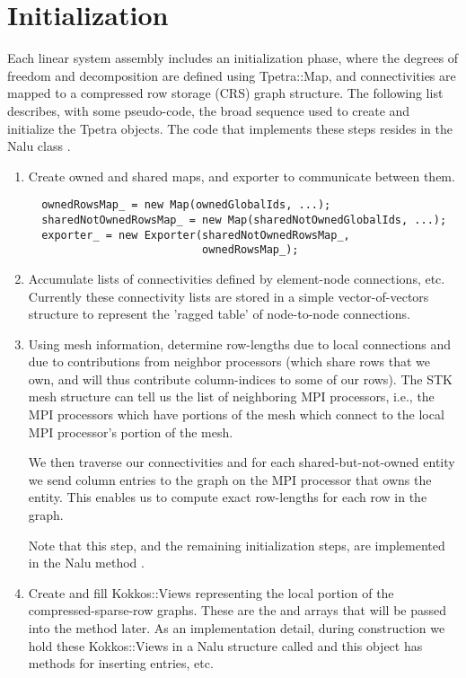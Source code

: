 
\chapter{Initialization}
Each linear system assembly includes an initialization phase, where the
degrees of freedom and decomposition are defined using Tpetra::Map, and
connectivities are mapped to a compressed row storage (CRS) graph structure.
The following list describes, with some pseudo-code, the broad sequence used
to create and initialize the Tpetra objects. The code that implements these
steps resides in the Nalu class .

\begin{enumerate}
\item Create owned and shared maps, and exporter to communicate between them.
\begin{verbatim}
  ownedRowsMap_ = new Map(ownedGlobalIds, ...);
  sharedNotOwnedRowsMap_ = new Map(sharedNotOwnedGlobalIds, ...);
  exporter_ = new Exporter(sharedNotOwnedRowsMap_,
                           ownedRowsMap_);
\end{verbatim}

\item
  Accumulate lists of connectivities defined by
  element-node connections, etc. Currently these connectivity lists are stored
  in a simple vector-of-vectors structure to represent the 'ragged table' of
  node-to-node connections.

\item
  Using mesh information, determine row-lengths due to local connections and due
  to contributions from neighbor processors (which share rows that we own, and
  will thus contribute column-indices to some of our rows). The STK mesh structure
  can tell us the list of neighboring MPI processors, i.e., the MPI processors
  which have portions of the mesh which connect to the local MPI processor's
  portion of the mesh.

  We then traverse our connectivities and for each shared-but-not-owned entity
  we send column entries to the graph on the MPI processor that owns the
  entity. This enables us to compute exact row-lengths for each row in the
  graph.

  Note that this step, and the remaining initialization steps, are implemented
  in the Nalu method .

\item
  Create and fill Kokkos::Views representing the local portion of the
  compressed-sparse-row graphs. These are the 
  and  arrays that will be passed into the
   method later. As an implementation
  detail, during construction we hold these Kokkos::Views in a Nalu structure
  called  and this object has methods for inserting
  entries, etc.


\end{enumerate}
